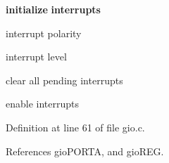 {\bfseries initialize} {\bfseries interrupts} ~\newline
~\newline
~\newline
~\newline

\begin{DoxyItemize}
\item interrupt polarity ~\newline
~\newline
~\newline

\item interrupt level ~\newline
~\newline

\item clear all pending interrupts ~\newline

\item enable interrupts 
\end{DoxyItemize}

Definition at line 61 of file gio.\+c.



References gio\+P\+O\+R\+TA, and gio\+R\+EG.


